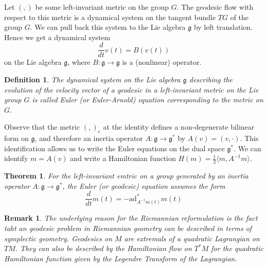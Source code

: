 \documentclass{article}
\newtheorem{thm}{Theorem}
\newtheorem{defn}{Definition}
\newtheorem{rmk}{Remark}
\begin{document}
\indent Let $ (,)$ be some left-invariant metric on the group $G$. The geodesic flow with respect to this metric is a dynamical system on the tangent bundle $TG$ of the group $G$. We can pull back this system to the Lie algebra $ \mathfrak{g}$ by left translation. Hence we get a dynamical system
\[
	\frac{d}{dt}v(t) = B(v(t))
\]
on the Lie algebra $ \mathfrak{g}$, where $ B: \mathfrak{g} \to \mathfrak{g}$ is a (nonlinear) operator.


\begin{defn}

	The dynamical system on the Lie algebra $ \mathfrak{g}$ describing the evolution of the velocity vector of a geodesic in a left-invariant metric on the Lie group $G$ is called \textit{Euler (or Euler-Arnold) equation} corresponding to the metric on $G$.

\end{defn}


Observe that the metric $(,)_e$ at the identity defines a non-degenerate bilinear form on $ \mathfrak{g}$, and therefore an inertia operator $ A: \mathfrak{g} \to \mathfrak{g}^*$ by $A(v) = (v,\cdot)$. This identification allows us to write the Euler equations on the dual space $ \mathfrak{g}^*$. We can identify $m=A(v)$ and write a Hamiltonian function $H(m) = \frac{1}{2} \langle m, A^{-1}m \rangle $.



\begin{thm}

	For the left-invariant emtric on a group generated by an inertia operator $ A: \mathfrak{g} \to \mathfrak{g}^*$, the Euler (or geodesic) equation assumes the form 
	\[
		\frac{d}{dt}m(t) = - \mathrm{ad}^*_{A^{-1} m(t)} m(t)
	\]
	
\end{thm}



\begin{rmk}

The underlying reason for the Riemannian reformulation is the fact taht an geodesic problem in \textit{Riemannian} geometry can be described in terms of \textit{symplectic} geometry. Geodesics on $M$ are extremals of a quadratic Lagrangian on $TM$. They can also be described by the Hamiltonian flow on $T^*M$ for the quadratic Hamiltonian function given by the Legendre Transform of the Lagrangian.\\
 
\end{rmk}
\end{document}
